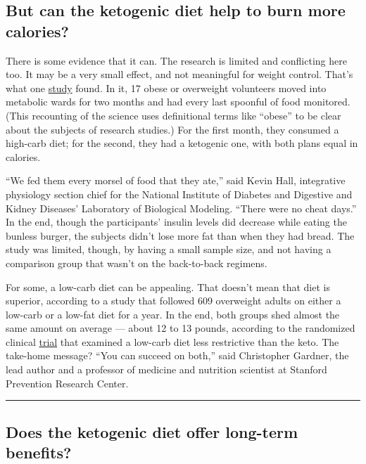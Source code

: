 \hypertarget{but-can-the-ketogenic-diet-help-to-burn-more-calories}{%
\subsection{But can the ketogenic diet help to burn more
calories?}\label{but-can-the-ketogenic-diet-help-to-burn-more-calories}}

There is some evidence that it can. The research is limited and
conflicting here too. It may be a very small effect, and not meaningful
for weight control. That's what one
\href{https://www.ncbi.nlm.nih.gov/pmc/articles/PMC4962163/}{study}
found. In it, 17 obese or overweight volunteers moved into metabolic
wards for two months and had every last spoonful of food monitored.
(This recounting of the science uses definitional terms like ``obese''
to be clear about the subjects of research studies.) For the first
month, they consumed a high-carb diet; for the second, they had a
ketogenic one, with both plans equal in calories.

``We fed them every morsel of food that they ate,'' said Kevin Hall,
integrative physiology section chief for the National Institute of
Diabetes and Digestive and Kidney Diseases' Laboratory of Biological
Modeling. ``There were no cheat days.'' In the end, though the
participants' insulin levels did decrease while eating the bunless
burger, the subjects didn't lose more fat than when they had bread. The
study was limited, though, by having a small sample size, and not having
a comparison group that wasn't on the back-to-back regimens.

For some, a low-carb diet can be appealing. That doesn't mean that diet
is superior, according to a study that followed 609 overweight adults on
either a low-carb or a low-fat diet for a year. In the end, both groups
shed almost the same amount on average --- about 12 to 13 pounds,
according to the randomized clinical
\href{https://jamanetwork.com/journals/jama/fullarticle/2673150?resultClick=1}{trial}
that examined a low-carb diet less restrictive than the keto. The
take-home message? ``You can succeed on both,'' said Christopher
Gardner, the lead author and a professor of medicine and nutrition
scientist at Stanford Prevention Research Center.

\begin{center}\rule{0.5\linewidth}{\linethickness}\end{center}

\hypertarget{does-the-ketogenic-diet-offer-long-term-benefits}{%
\subsection{Does the ketogenic diet offer long-term
benefits?}\label{does-the-ketogenic-diet-offer-long-term-benefits}}

